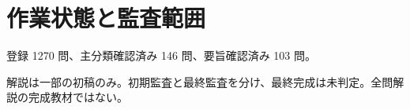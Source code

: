 \chapter{作業状態と監査範囲}
登録 1270 問、主分類確認済み 146 問、要旨確認済み 103 問。
\par 解説は一部の初稿のみ。初期監査と最終監査を分け、最終完成は未判定。全問解説の完成教材ではない。
